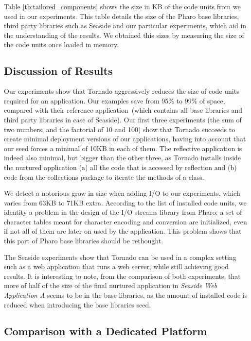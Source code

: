Table \ref{tb:tailored_components} shows the size in KB of the code units from we used in our experiments. This table details the size of the Pharo base libraries, third party libraries such as Seaside and our particular experiments, which aid in the understanding of the results. We obtained this sizes by measuring the size of the code units once loaded in memory.

\subsection{Discussion of Results}
Our experiments show that Tornado aggressively reduces the size of code units required for an application. Our examples save from 95\% to 99\% of space, compared with their reference application~(which contains all base libraries and third party libraries in case of Seaside). Our first three experiments (the sum of two numbers, and the factorial of 10 and 100) show that Tornado succeeds to create minimal deployment versions of our applications, having into account that our seed forces a minimal of 10KB in each of them. The reflective application is indeed also minimal, but bigger than the other three, as Tornado installs inside the nurtured application (a) all the code that is accessed by reflection and (b) code from the collections package to iterate the methods of a class.

We detect a notorious grow in size when adding I/O to our experiments, which varies from 63KB to 71KB extra. According to the list of installed code units, we identity a problem in the design of the I/O streams library from Pharo: a set of character tables meant for character encoding and conversion are initialized, even if not all of them are later on used by the application. This problem shows that this part of Pharo base libraries should be rethought.

The Seaside experiments show that Tornado can be used in a complex setting such as a web application that runs a web server, while still achieving good results. It is interesting to note, from the comparison of both experiments, that more of half of the size of the final nurtured application in \emph{Seaside Web Application A} seems to be in the base libraries, as the amount of installed code is reduced when introducing the base libraries seed.

\subsection{Comparison with a Dedicated Platform}

